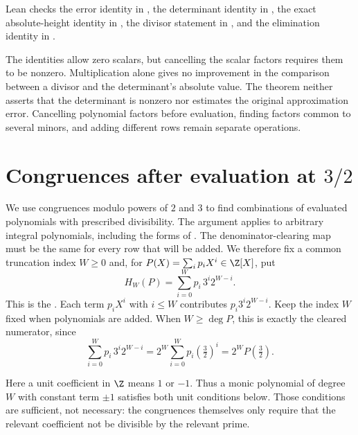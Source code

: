 \noindent Lean checks the error identity in
, the determinant identity in
, the exact absolute-height identity in
, the divisor statement in
, and the elimination identity in
.

The identities allow zero scalars, but cancelling the scalar factors
requires them to be nonzero. Multiplication alone gives no improvement
in the comparison between a divisor and the determinant's absolute
value. The theorem neither asserts that the determinant is nonzero nor
estimates the original approximation error. Cancelling polynomial
factors before evaluation, finding factors common to several minors,
and adding different rows remain separate operations.

\section{Congruences after evaluation at \texorpdfstring{$3/2$}{3/2}}\label{long1049:sec:endpoints}

We use congruences modulo powers of $2$ and $3$ to find combinations
of evaluated polynomials with prescribed divisibility. The argument
applies to arbitrary integral polynomials, including the forms of
\cite[Sections~3--5]{zudilin2004}. The denominator-clearing map must be the same for every row that
will be added. We therefore fix a common truncation index $W\ge0$
and, for $P(X)=\sum_i p_iX^i\in\Z[X]$, put
\[
 H_W(P)=\sum_{i=0}^{W}p_i\,3^i2^{W-i}.
\]
This is the
.  Each term \(p_iX^i\) with \(i\le W\) contributes
\(p_i3^i2^{W-i}\). Keep the index \(W\) fixed when polynomials are
added. When \(W\ge\deg P\), this is exactly the cleared numerator, since
\[
 \sum_{i=0}^{W}p_i\,3^i2^{W-i}=2^{W}\sum_{i=0}^{W}p_i\left(\tfrac32\right)^{i}
 =2^{W}P\!\left(\tfrac32\right).
\]

Here a unit coefficient in $\Z$ means $1$ or $-1$. Thus a monic
polynomial of degree $W$ with constant term $\pm1$ satisfies both unit
conditions below. Those conditions are sufficient, not necessary:
the congruences themselves only require that the relevant coefficient
not be divisible by the relevant prime.

